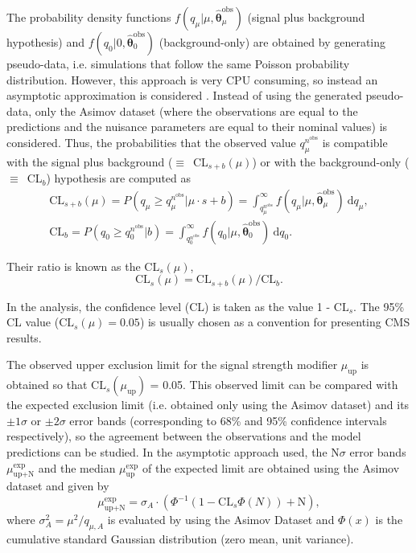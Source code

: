 \documentclass[../main.tex]{subfiles}
\begin{document}
The probability density functions $f(q_\mu|\mu,\boldsymbol{\hat{\theta}}_\mu^\text{obs})$ (signal plus background hypothesis) and $f(q_0|0,\boldsymbol{\hat{\theta}}_0^\text{obs})$ (background-only) are obtained by generating pseudo-data, i.e. simulations that follow the same Poisson probability distribution. However, this approach is very CPU consuming, so instead an asymptotic approximation is considered \cite{hh:results:asymptotic}. Instead of using the generated pseudo-data, only the Asimov dataset (where the observations are equal to the predictions and the nuisance parameters are equal to their nominal values) is considered. Thus, the probabilities that the observed value $q_\mu^{n^{\text{obs}}}$ is compatible with the signal plus background ($\equiv$~CL$_{s+b}(\mu)$) or with the background-only ($\equiv$~CL$_{b}$) hypothesis are computed as
\begin{equation}
\begin{matrix}
\text{CL}_{s+b}(\mu) = P(q_\mu \geq q_\mu^{n^{\text{obs}}} | \mu\cdot s + b) = \int_{q_\mu^{n^{\text{obs}}}}^\infty f(q_\mu|\mu, \boldsymbol{\hat{\theta}}_\mu^\text{obs})~\text{d}q_\mu, \\
\text{CL}_{b} = P(q_0 \geq q_0^{n^{\text{obs}}} | b) = \int_{q_0^{n^{\text{obs}}}}^\infty f(q_0|\mu, \boldsymbol{\hat{\theta}}_0^\text{obs})~\text{d}q_0.
\end{matrix}
\end{equation}

Their ratio is known as the $\text{CL}_{s}(\mu)$,
\begin{equation}
\text{CL}_{s}(\mu) = \text{CL}_{s+b}(\mu) / \text{CL}_{b}.
\end{equation}

In the \hhbbtt{} analysis, the confidence level (CL) is taken as the value 1 - $\text{CL}_{s}$. The 95\% CL value ($\text{CL}_{s}(\mu) = 0.05$) is usually chosen as a convention for presenting CMS results.

The observed upper exclusion limit for the signal strength modifier $\mu_{\text{up}}$ is obtained so that $\text{CL}_{s}(\mu_{\text{up}})$ = 0.05. This observed limit can be compared with the expected exclusion limit (i.e. obtained only using the Asimov dataset) and its $\pm1\sigma$ or $\pm2\sigma$ error bands (corresponding to 68\% and 95\% confidence intervals respectively), so the agreement between the observations and the model predictions can be studied. In the asymptotic approach used, the N$\sigma$ error bands $\mu_{\text{up+N}}^\text{exp}$ and the median $\mu_{\text{up}}^\text{exp}$ of the expected limit are obtained using the Asimov dataset and given by \cite{hh:results:asymptotic}
\begin{equation}
\mu_{\text{up+N}}^\text{exp} = \sigma_A\cdot\left(\Phi^{-1}(1 - \text{CL}_s\Phi(N)) + \text{N}  \right),
\end{equation}
where $\sigma^2_A=\mu^2/q_{\mu, A}$ is evaluated by using the Asimov Dataset and $\Phi(x)$ is the cumulative standard Gaussian distribution (zero mean, unit variance).
\end{document}
